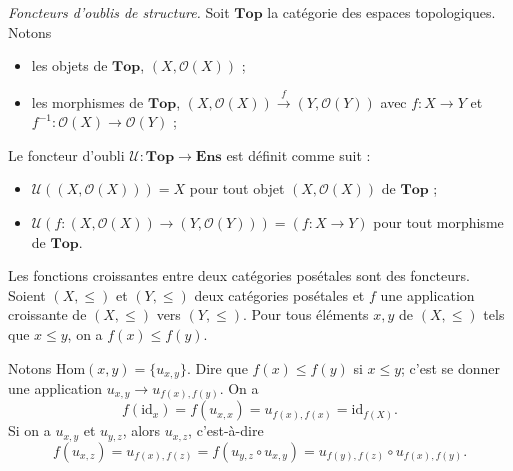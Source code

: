 \begin{exm}
  \begin{item}
    \item \textsl{Foncteurs d'oublis de structure.}
      Soit $\mathbf{Top}$ la catégorie des espaces topologiques.
      Notons
      \begin{itemize}
        \item les objets de $\mathbf{Top}$, $(X,\mathcal{O}(X))$ ;
        \item les morphismes de $\mathbf{Top}$, $(X,\mathcal{O}(X)) \xrightarrow{f} (Y, \mathcal{O}(Y))$ avec $f : X \to Y$ et $f^{-1} : \mathcal{O}(X) \to \mathcal{O}(Y)$ ;
      \end{itemize}

      Le foncteur d'oubli $\mathcal{U} : \mathbf{Top} \to \mathbf{Ens}$ est définit comme suit :
      \begin{itemize}
        \item $\mathcal{U}((X,\mathcal{O}(X))) = X$ pour tout objet $(X,\mathcal{O}(X))$ de $\mathbf{Top}$ ;
        \item $\mathcal{U}(f : (X, \mathcal{O}(X)) \to (Y, \mathcal{O}(Y))) = (f : X \to Y)$ pour tout morphisme de $\mathbf{Top}$.
      \end{itemize}
    \item Les fonctions croissantes entre deux catégories posétales sont des foncteurs.
      Soient $(X,\le)$ et $(Y,\le)$ deux catégories posétales et $f$ une application croissante de $(X,\le)$ vers $(Y, \le)$.
      Pour tous éléments $x,y$ de  $(X, \le)$ tels que $x \le y$, on a $f(x) \le f(y)$.

      Notons $\mathrm{Hom}(x,y) = \{u_{x,y}\}$.
      Dire que $f(x) \le f(y)$ si $x \le y$; c'est se donner une application $u_{x,y} \to u_{f(x),f(y)}$.
      On a \[
        f(\mathrm{id}_x) = f(u_{x,x}) = u_{f(x),f(x)} = \mathrm{id}_{f(X)}
      .\] 
      Si on a $u_{x,y}$ et $u_{y,z}$, alors $u_{x,z}$, c'est-à-dire  \[
        f(u_{x,z}) = u_{f(x),f(z)} = f(u_{y,z} \circ  u_{x,y}) = u_{f(y),f(z)} \circ u_{f(x),f(y)}
      .\]
  \end{item}
\end{exm}

